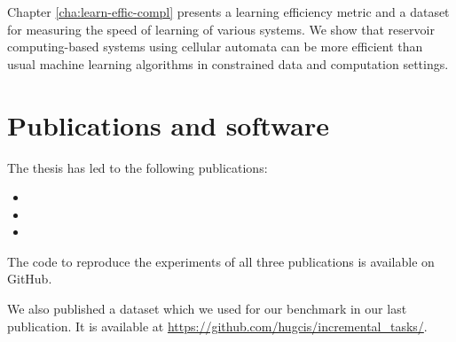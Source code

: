 Chapter \ref{cha:learn-effic-compl} presents a learning efficiency metric and a
dataset for measuring the speed of learning of various systems. We show that
reservoir computing-based systems using cellular automata can be more efficient
than usual machine learning algorithms in constrained data and computation
settings.


\section{Publications and software}

The thesis has led to the following publications:

\begin{itemize}
  \item {}
  \item {}
  \item {}
\end{itemize}

The code to reproduce the experiments of all three publications is available on
GitHub.

We also published a dataset which we used for our benchmark in our last
publication. It is available at
\url{https://github.com/hugcis/incremental_tasks/}.
